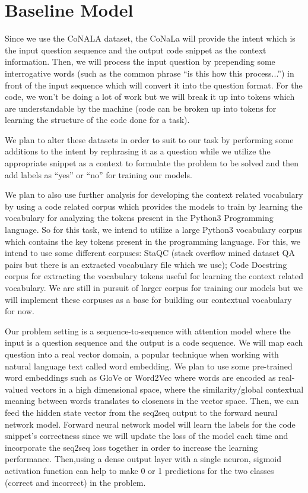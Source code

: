 \documentclass[11pt,a4paper]{article}
\begin{document}
\section{Baseline Model}
Since we use the CoNALA dataset, the CoNaLa will provide the intent
which is the input question sequence and the output code snippet as
the context information. Then, we will process the input question by
prepending some interrogative words (such as the common phrase “is
this how this process...”) in front of the input sequence which will
convert it into the question format. For the code, we won’t be doing a
lot of work but we will break it up into tokens which are
understandable by the machine (code can be broken up into tokens for
learning the structure of the code done for a task).

We plan to alter these datasets in order to suit to our task by
performing some additions to the intent by rephrasing it as a question
while we utilize the appropriate snippet as a context to formulate the
problem to be solved and then add labels as “yes” or “no” for training
our models.

We plan to also use further analysis for developing the context
related vocabulary by using a code related corpus which provides the
models to train by learning the vocabulary for analyzing the tokens
present in the Python3 Programming language. So for this task, we
intend to utilize a large Python3 vocabulary corpus which contains the
key tokens present in the programming language. For this, we intend to
use some different corpuses: StaQC (stack overflow mined dataset QA
pairs but there is an extracted vocabulary file which we use); Code
Docstring corpus for extracting the vocabulary tokens useful for
learning the context related vocabulary. We are still in pursuit of
larger corpus for training our models but we will implement these
corpuses as a base for building our contextual vocabulary for now.

Our problem setting is a sequence-to-sequence with attention model
where the input is a question sequence and the output is a code
sequence. We will map each question into a real vector domain, a
popular technique when working with natural language text called word
embedding. We plan to use some pre-trained word embeddings such as
GloVe or Word2Vec where words are encoded as real-valued vectors in a
high dimensional space, where the similarity/global contextual meaning
between words translates to closeness in the vector space. Then, we
can feed the hidden state vector from the seq2seq output to the
forward neural network model.  Forward neural network model will learn
the labels for the code snippet’s correctness since we will update the
loss of the model each time and incorporate the seq2seq loss together
in order to increase the learning performance. Then,using a dense
output layer with a single neuron, sigmoid activation function can
help to make 0 or 1 predictions for the two classes (correct and
incorrect) in the problem. 
\end{document}
